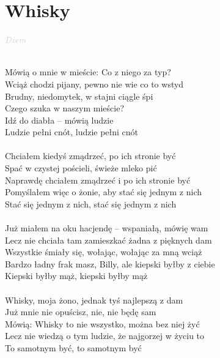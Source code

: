 \documentclass[a5paper, 10pt]{book}
\begin{document}
\newpage
\section{Whisky}\textcolor{lightgray}{\textit{Dżem}}\\~\\
\begin{minipage}[t]{0.8\textwidth}
Mówią o mnie w mieście: Co z niego za typ?\\
Wciąż chodzi pijany, pewno nie wie co to wstyd\\
Brudny, niedomytek, w stajni ciągle śpi\\
Czego szuka w naszym mieście?\\
Idź do diabła – mówią ludzie\\
Ludzie pełni cnót, ludzie pełni cnót\\
\\
Chciałem kiedyś zmądrzeć, po ich stronie być\\
Spać w czystej pościeli, świeże mleko pić\\
Naprawdę chciałem zmądrzeć i po ich stronie być\\
Pomyślałem więc o żonie, aby stać się jednym z nich\\
Stać się jednym z nich, stać się jednym z nich\\
\\
Już miałem na oku hacjendę – wspaniałą, mówię wam\\
Lecz nie chciała tam zamieszkać żadna z pięknych dam\\
Wszystkie śmiały się, wołając, wołając za mną wciąż\\
Bardzo ładny frak masz, Billy, ale kiepski byłby z ciebie\\
Kiepski byłby mąż, kiepski byłby mąż\\
\\
Whisky, moja żono, jednak tyś najlepszą z dam\\
Już mnie nie opuścisz, nie, nie będę sam\\
Mówią: Whisky to nie wszystko, można bez niej żyć\\
Lecz nie wiedzą o tym ludzie, że najgorzej w życiu to\\
To samotnym być, to samotnym być\\
\end{minipage}
\end{document}

